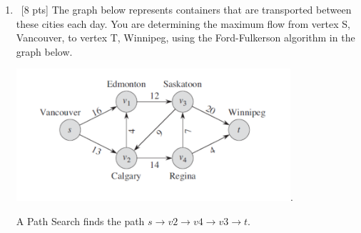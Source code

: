 \documentclass[12pt]{article}
\newenvironment{sol}[1][Solution]{\begin{trivlist}\item[\hskip\labelsep {\bfseries #1:}]}{\end{trivlist}}
\begin{document}
\begin{enumerate}
    \item \ [8 pts] The graph below represents containers that are transported between these cities each day. You are determining the maximum flow from vertex S, Vancouver, to vertex T, Winnipeg, using the Ford-Fulkerson algorithm in the graph below.
    \begin{center}
        \includegraphics[width=0.8\textwidth]{p5.png}.
    \end{center}
    A Path Search finds the path $s \rightarrow v2 \rightarrow v4 \rightarrow v3 \rightarrow t$.


\end{enumerate}
\end{document}
